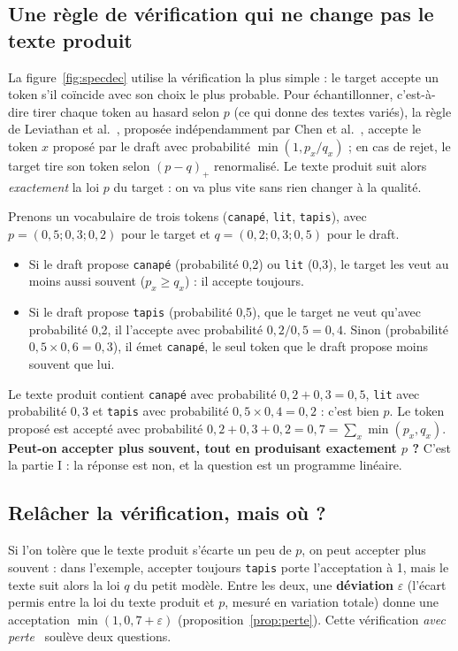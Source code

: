 \documentclass[11pt,a4paper]{article}
\newcommand{\tok}[1]{\texttt{#1}}
\theoremstyle{plain}
\begin{document}
\subsection{Une règle de vérification qui ne change pas le texte produit}\label{sec:regle}
La figure~\ref{fig:specdec} utilise la vérification la plus simple : le target accepte un token s'il coïncide avec son choix le plus probable.
Pour échantillonner, c'est-à-dire tirer chaque token au hasard selon $p$ (ce qui donne des textes variés), la règle de Leviathan et al.~\cite{leviathan}, proposée indépendamment par Chen et al.~\cite{chen}, accepte le token $x$ proposé par le draft avec probabilité $\min(1,p_x/q_x)$ ; en cas de rejet, le target tire son token selon $(p-q)_+$ renormalisé.
Le texte produit suit alors \emph{exactement} la loi $p$ du target : on va plus vite sans rien changer à la qualité.

Prenons un vocabulaire de trois tokens (\tok{canapé}, \tok{lit}, \tok{tapis}), avec $p=(0{,}5;0{,}3;0{,}2)$ pour le target et $q=(0{,}2;0{,}3;0{,}5)$ pour le draft.
\begin{itemize}
\item Si le draft propose \tok{canapé} (probabilité 0,2) ou \tok{lit} (0,3), le target les veut au moins aussi souvent ($p_x\ge q_x$) : il accepte toujours.
\item Si le draft propose \tok{tapis} (probabilité 0,5), que le target ne veut qu'avec probabilité 0,2, il l'accepte avec probabilité $0{,}2/0{,}5=0{,}4$. Sinon (probabilité $0{,}5\times0{,}6=0{,}3$), il émet \tok{canapé}, le seul token que le draft propose moins souvent que lui.
\end{itemize}
Le texte produit contient \tok{canapé} avec probabilité $0{,}2+0{,}3=0{,}5$, \tok{lit} avec probabilité $0{,}3$ et \tok{tapis} avec probabilité $0{,}5\times0{,}4=0{,}2$ : c'est bien $p$.
Le token proposé est accepté avec probabilité $0{,}2+0{,}3+0{,}2=0{,}7=\sum_x\min(p_x,q_x)$.
\textbf{Peut-on accepter plus souvent, tout en produisant exactement $p$ ?} C'est la partie I : la réponse est non, et la question est un programme linéaire.

\subsection{Relâcher la vérification, mais où ?}\label{sec:ou}
Si l'on tolère que le texte produit s'écarte un peu de $p$, on peut accepter plus souvent : dans l'exemple, accepter toujours \tok{tapis} porte l'acceptation à 1, mais le texte suit alors la loi $q$ du petit modèle.
Entre les deux, une \textbf{déviation} $\varepsilon$ (l'écart permis entre la loi du texte produit et $p$, mesuré en variation totale) donne une acceptation $\min(1,0{,}7+\varepsilon)$ (proposition~\ref{prop:perte}).
Cette vérification \emph{avec perte}~\cite{fuzzy} soulève deux questions.
\end{document}
